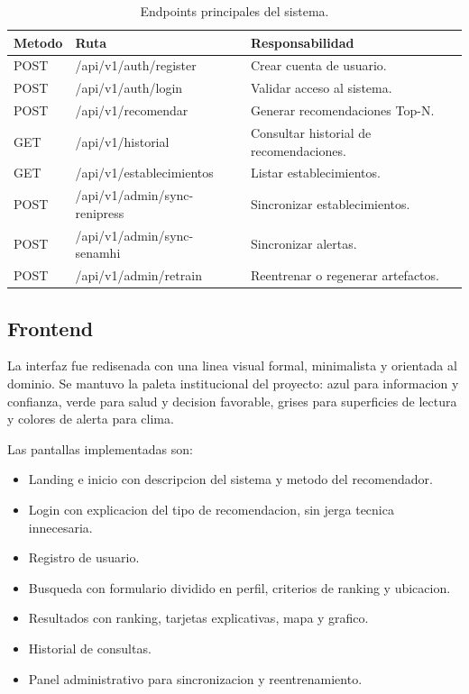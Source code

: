 \documentclass[12pt,a4paper]{article}
\begin{document}
\begin{table}[H]
\centering
\caption{Endpoints principales del sistema.}
\label{tab:endpoints}
\small
\begin{tabular}{p{2.5cm}p{4.8cm}p{5.8cm}}
\toprule
Metodo & Ruta & Responsabilidad \\
\midrule
POST & /api/v1/auth/register & Crear cuenta de usuario. \\
POST & /api/v1/auth/login & Validar acceso al sistema. \\
POST & /api/v1/recomendar & Generar recomendaciones Top-N. \\
GET & /api/v1/historial & Consultar historial de recomendaciones. \\
GET & /api/v1/establecimientos & Listar establecimientos. \\
POST & /api/v1/admin/sync-renipress & Sincronizar establecimientos. \\
POST & /api/v1/admin/sync-senamhi & Sincronizar alertas. \\
POST & /api/v1/admin/retrain & Reentrenar o regenerar artefactos. \\
\bottomrule
\end{tabular}
\end{table}

\subsection{Frontend}
La interfaz fue redisenada con una linea visual formal, minimalista y orientada al dominio. Se mantuvo la paleta institucional del proyecto: azul para informacion y confianza, verde para salud y decision favorable, grises para superficies de lectura y colores de alerta para clima.

Las pantallas implementadas son:
\begin{itemize}[leftmargin=*]
  \item Landing e inicio con descripcion del sistema y metodo del recomendador.
  \item Login con explicacion del tipo de recomendacion, sin jerga tecnica innecesaria.
  \item Registro de usuario.
  \item Busqueda con formulario dividido en perfil, criterios de ranking y ubicacion.
  \item Resultados con ranking, tarjetas explicativas, mapa y grafico.
  \item Historial de consultas.
  \item Panel administrativo para sincronizacion y reentrenamiento.
\end{itemize}
\end{document}

